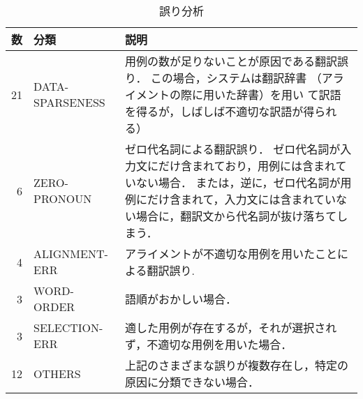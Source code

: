 \begin{table}
\caption{誤り分析}
\begin{center}
\label{t3}
\begin{tabular}{rll}
\hline
数 & 分類	& 説明 \\
\hline
\hline
21 & DATA-SPARSENESS	& 
	  \begin{minipage}{80mm}
	  \vspace{1mm}
  用例の数が足りないことが原因である翻訳誤り．
  この場合，システムは翻訳辞書 （アライメントの際に用いた辞書）を用い
  て訳語を得るが，しばしば不適切な訳語が得られる）	  
	  \vspace{1mm}
	  \end{minipage}  \\
\hline
 6 & ZERO-PRONOUN & 
	  \begin{minipage}{80mm}
	  \vspace{1mm}
  ゼロ代名詞による翻訳誤り．
  ゼロ代名詞が入力文にだけ含まれており，用例には含まれていない場合．
  または，逆に，ゼロ代名詞が用例にだけ含まれて，入力文には含まれていな
  い場合に，翻訳文から代名詞が抜け落ちてしまう．
	  \vspace{1mm}
	  \end{minipage}  \\
\hline
 4 & ALIGNMENT-ERR		& 
	  \begin{minipage}{80mm}
	  \vspace{1mm}
   アライメントが不適切な用例を用いたことによる翻訳誤り.
	  \vspace{1mm}
	  \end{minipage}
  \\
\hline
 3 & WORD-ORDER		& 
	  \begin{minipage}{80mm}
	  \vspace{1mm}
  語順がおかしい場合．
	  \vspace{1mm}
	  \end{minipage}  \\
\hline
 3 & SELECTION-ERR		& 
	  \begin{minipage}{80mm}
	  \vspace{1mm}
  適した用例が存在するが，それが選択されず，不適切な用例を用いた場合．
	  \vspace{1mm}
	  \end{minipage}  \\
\hline
12 & OTHERS		& 
	  \begin{minipage}{80mm}
	  \vspace{1mm}
  上記のさまざまな誤りが複数存在し，特定の原因に分類できない場合．
	  \vspace{1mm}
	  \end{minipage}  \\
\hline
\end{tabular}
\end{center}
\end{table}


